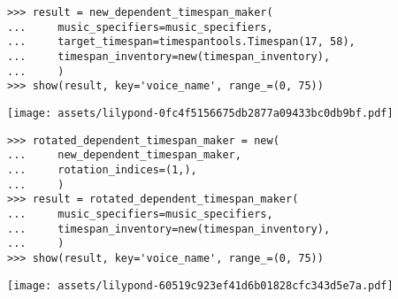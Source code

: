 \begin{comment}
<abjad>
result = new_dependent_timespan_maker(
    music_specifiers=music_specifiers,
    target_timespan=timespantools.Timespan(17, 58),
    timespan_inventory=new(timespan_inventory),
    )
show(result, key='voice_name', range_=(0, 75))
</abjad>
\end{comment}

\begin{singlespacing}
\vspace{-0.5\baselineskip}
\begin{lstlisting}
>>> result = new_dependent_timespan_maker(
...     music_specifiers=music_specifiers,
...     target_timespan=timespantools.Timespan(17, 58),
...     timespan_inventory=new(timespan_inventory),
...     )
>>> show(result, key='voice_name', range_=(0, 75))
\end{lstlisting}
\noindent\texttt{[image: assets/lilypond-0fc4f5156675db2877a09433bc0db9bf.pdf]}
\end{singlespacing}

\begin{comment}
<abjad>
rotated_dependent_timespan_maker = new(
    new_dependent_timespan_maker,
    rotation_indices=(1,),
    )
result = rotated_dependent_timespan_maker(
    music_specifiers=music_specifiers,
    timespan_inventory=new(timespan_inventory),
    )
show(result, key='voice_name', range_=(0, 75))
</abjad>
\end{comment}

\begin{singlespacing}
\vspace{-0.5\baselineskip}
\begin{lstlisting}
>>> rotated_dependent_timespan_maker = new(
...     new_dependent_timespan_maker,
...     rotation_indices=(1,),
...     )
>>> result = rotated_dependent_timespan_maker(
...     music_specifiers=music_specifiers,
...     timespan_inventory=new(timespan_inventory),
...     )
>>> show(result, key='voice_name', range_=(0, 75))
\end{lstlisting}
\noindent\texttt{[image: assets/lilypond-60519c923ef41d6b01828cfc343d5e7a.pdf]}
\end{singlespacing}

\begin{comment}
<abjad>
rotated_dependent_timespan_maker = new(
    new_dependent_timespan_maker,
    rotation_indices=(1, -1),
    )
result = rotated_dependent_timespan_maker(
    music_specifiers=music_specifiers,
    timespan_inventory=new(timespan_inventory),
    )
show(result, key='voice_name', range_=(0, 75))
</abjad>
\end{comment}

